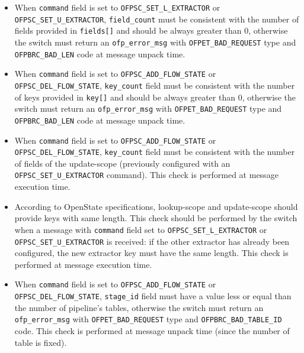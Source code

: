 \begin{itemize}
\item When \texttt{command} field is set to \texttt{OFPSC\_SET\_L\_EXTRACTOR} or \texttt{OFPSC\_SET\_U\_EXTRACTOR}, \texttt{field\_count} must be consistent with the number of fields provided in \texttt{fields[]} and should be always greater than 0, otherwise the switch must return an \texttt{ofp\_error\_msg} with \texttt{OFPET\_BAD\_REQUEST} type and \texttt{OFPBRC\_BAD\_LEN} code at message unpack time.

\item When \texttt{command} field is set to \texttt{OFPSC\_ADD\_FLOW\_STATE} or \texttt{OFPSC\_DEL\_FLOW\_STATE}, \texttt{key\_count} field must be consistent with the number of keys provided in \texttt{key[]} and should be always greater than 0, otherwise 
the switch must return an \texttt{ofp\_error\_msg} with \texttt{OFPET\_BAD\_REQUEST} type and \texttt{OFPBRC\_BAD\_LEN} code at message unpack time.

\item When \texttt{command} field is set to \texttt{OFPSC\_ADD\_FLOW\_STATE} or \texttt{OFPSC\_DEL\_FLOW\_STATE}, \texttt{key\_count} field must be consistent with the number of fields of the update-scope (previously configured with an \texttt{OFPSC\_SET\_U\_EXTRACTOR} command). This check is performed at message execution time.

\item According to OpenState specifications, lookup-scope and update-scope should provide keys with same length. This check should be performed by the switch when a message with \texttt{command} field set to \texttt{OFPSC\_SET\_L\_EXTRACTOR} or \texttt{OFPSC\_SET\_U\_EXTRACTOR} is received: if the other extractor has already been configured, the new extractor key must have the same length. This check is performed at message execution time.

\item When \texttt{command} field is set to \texttt{OFPSC\_ADD\_FLOW\_STATE} or \texttt{OFPSC\_DEL\_FLOW\_STATE}, \texttt{stage\_id} field must have a value less or equal than the number of pipeline’s tables, otherwise the switch must return an \texttt{ofp\_error\_msg} with \texttt{OFPET\_BAD\_REQUEST} type and \texttt{OFPBRC\_BAD\_TABLE\_ID} code. This check is performed at message unpack time (since the number of table is fixed).

\end{itemize}

